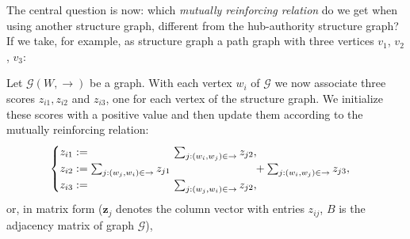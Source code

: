 \documentclass[a4paper,11pt]{report}
\newcommand{\graf}{\mathscr{G}}
\begin{document}
The central question is now: which \emph{mutually reinforcing relation} do we get when using another structure graph, 
different from the hub-authority structure graph? 
If we take, for example, as structure graph a path graph with three vertices $v_1$, $v_2$, 
$v_3$:
\begin{center}
\end{center}
Let $\graf(W,\to)$ be a graph. With each vertex $w_i$ of $\graf$ we now associate three scores $z_{i1}, z_{i2}$ and 
$z_{i3}$, one for each vertex of the structure graph. We initialize these scores 
with a positive value and then update them according to the mutually reinforcing 
relation:
$$\begin{cases} z_{i1} := \hspace{75px} \sum_{j:(w_i,w_j)\in \to} z_{j2},\\ 
z_{i2} := \sum_{j:(w_j,w_i)\in \to} z_{j1}\hspace{75px} + \sum_{j:(w_i,w_j)\in \to} z_{j3},\\
z_{i3} := \hspace{75px}\sum_{j:(w_j,w_i)\in \to} z_{j2},
\end{cases}$$or, in matrix form ($\mathbf{z}_j$ denotes the column vector with entries $z_{ij}$, $B$ is the adjacency matrix of graph $\graf$),
\end{document}
